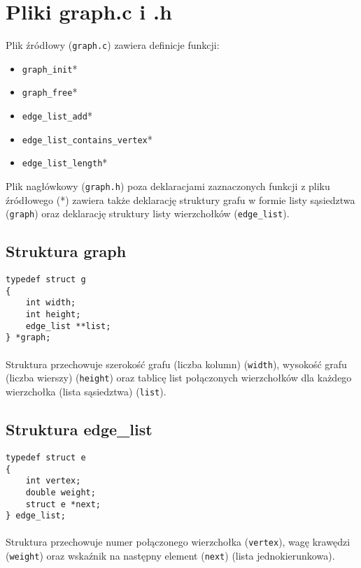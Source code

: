 \documentclass[11pt,a4paper]{report}
\begin{document}
    \section{Pliki graph.c i .h}
    Plik źródłowy (\verb|graph.c|) zawiera definicje funkcji:
    \begin{itemize}
        \item \verb|graph_init|*
        \item \verb|graph_free|*
        \item \verb|edge_list_add|*
        \item \verb|edge_list_contains_vertex|*
        \item \verb|edge_list_length|*
    \end{itemize}
    Plik nagłówkowy (\verb|graph.h|) poza deklaracjami zaznaczonych funkcji z pliku źródłowego (*) zawiera także deklarację struktury grafu w formie listy sąsiedztwa (\verb|graph|) oraz deklarację struktury listy wierzchołków (\verb|edge_list|).\\
    \subsection{Struktura graph}
    \verb|typedef struct g|\\
    \verb|{|\\
    \verb|    int width;|\\
    \verb|    int height;|\\
    \verb|    edge_list **list;|\\
    \verb|} *graph;|\\
    \\
    Struktura przechowuje szerokość grafu (liczba kolumn) (\verb|width|), wysokość grafu (liczba wierszy) (\verb|height|) oraz tablicę list połączonych wierzchołków dla każdego wierzchołka (lista sąsiedztwa) (\verb|list|).\\
    \subsection{Struktura edge\_list}
    \verb|typedef struct e|\\
    \verb|{|\\
    \verb|    int vertex;|\\
    \verb|    double weight;|\\
    \verb|    struct e *next;|\\
    \verb|} edge_list;|\\
    \\
    Struktura przechowuje numer połączonego wierzchołka (\verb|vertex|), wagę krawędzi (\verb|weight|) oraz wskaźnik na następny element (\verb|next|) (lista jednokierunkowa).\\
\end{document}
